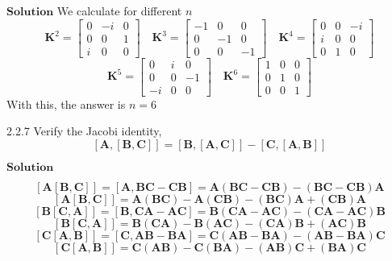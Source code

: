 $\boxed{\textbf{Solution}}$ We calculate for different $n$
$$\mathbf{K}^2 = \begin{bmatrix}{0} & {-i} & {0} \\ {0} & {0} & {1} \\ {i} & {0} & {0}\end{bmatrix} \quad \mathbf{K}^3=\begin{bmatrix}{-1} & {0} & {0} \\ {0} & {-1} & {0} \\ {0} & {0} & {-1}\end{bmatrix} \quad \mathbf{K}^4 = \begin{bmatrix}{0} & {0} & {-i} \\ {i} & {0} & {0} \\ {0} & {1} & {0}\end{bmatrix}$$
$$\mathbf{K}^5 = \begin{bmatrix}{0} & {i} & {0} \\ {0} & {0} & {-1} \\ {-i} & {0} & {0}\end{bmatrix} \quad \mathbf{K}^6 = \begin{bmatrix}{1} & {0} & {0} \\ {0} & {1} & {0} \\ {0} & {0} & {1}\end{bmatrix}$$
With this, the answer is $n=6$


\newpage


\begin{mybox}{2.2.7}
Verify the Jacobi identity,
$$[\mathbf{A},[\mathbf{B}, \mathbf{C}]]=[\mathbf{B},[\mathbf{A}, \mathbf{C}]]-[\mathbf{C},[\mathbf{A}, \mathbf{B}]]$$
\end{mybox}

$\boxed{\textbf{Solution}}$ 

$$
[\mathbf{A}[\mathbf{B}, \mathbf{C}]]=[\mathbf{A}, \mathbf{B} \mathbf{C}-\mathbf{C} \mathbf{B}]=\mathbf{A}(\mathbf{B} \mathbf{C}-\mathbf{C} \mathbf{B})-(\mathbf{B} \mathbf{C}-\mathbf{C} \mathbf{B}) \mathbf{A} $$
$$[\mathbf{A}[\mathbf{B}, \mathbf{C}]]=\mathbf{A}(\mathbf{B} \mathbf{C})-\mathbf{A}(\mathbf{C} \mathbf{B})-(\mathbf{B} \mathbf{C}) \mathbf{A}+(\mathbf{C} \mathbf{B}) \mathbf{A} $$
$$[\mathbf{B}[\mathbf{C}, \mathbf{A}]]=[\mathbf{B}, \mathbf{C} \mathbf{A}-\mathbf{A} \mathbf{C}]=\mathbf{B}(\mathbf{C A}-\mathbf{A} \mathbf{C})-(\mathbf{C A}-\mathbf{A} \mathbf{C}) \mathbf{B} $$
$$[\mathbf{B}[\mathbf{C}, \mathbf{A}]]=\mathbf{B}(\mathbf{C} \mathbf{A})-\mathbf{B}(\mathbf{A} \mathbf{C})-(\mathbf{C} \mathbf{A}) \mathbf{B}+(\mathbf{A} \mathbf{C}) \mathbf{B} $$
$$[\mathbf{C}[\mathbf{A}, \mathbf{B}]]=[\mathbf{C}, \mathbf{A} \mathbf{B}-\mathbf{B} \mathbf{A}]=\mathbf{C}(\mathbf{A} \mathbf{B}-\mathbf{B} \mathbf{A})-(\mathbf{A} \mathbf{B}-\mathbf{B} \mathbf{A}) \mathbf{C} $$
$$[\mathbf{C}[\mathbf{A}, \mathbf{B}]]=\mathbf{C}(\mathbf{A} \mathbf{B})-\mathbf{C}(\mathbf{B} \mathbf{A})-(\mathbf{A} \mathbf{B}) \mathbf{C}+(\mathbf{B} \mathbf{A}) \mathbf{C} $$


